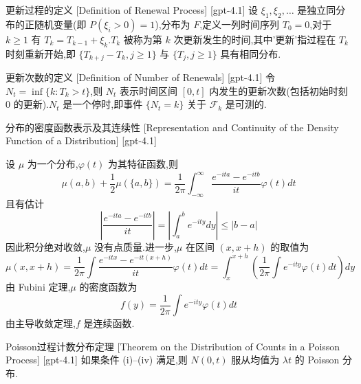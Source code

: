 \documentclass[UTF8]{ctexart}
\begin{document}
    
    
    \begin{dfn}
        {更新过程的定义}
        [Definition of Renewal Process]
        [gpt-4.1]
        设 $\xi_1, \xi_2, \ldots$ 是独立同分布的正随机变量(即 $P(\xi_i > 0) = 1$),分布为 $F$,定义一列时间序列 $T_0 = 0$,对于 $k \geq 1$ 有 $T_k = T_{k-1} + \xi_k$.$T_k$ 被称为第 $k$ 次更新发生的时间,其中'更新'指过程在 $T_k$ 时刻重新开始,即 $\{T_{k+j} - T_k, j \ge 1\}$ 与 $\{T_j, j \ge 1\}$ 具有相同分布.

    \end{dfn}
    
    
    
    \begin{dfn}
        {更新次数的定义}
        [Definition of Number of Renewals]
        [gpt-4.1]
        令 $N_t = \inf\{k : T_k > t\}$,则 $N_t$ 表示时间区间 $[0, t]$ 内发生的更新次数(包括初始时刻 0 的更新).$N_t$ 是一个停时,即事件 $\{N_t = k\}$ 关于 $\mathcal{F}_k$ 是可测的.

    \end{dfn}
    
    
    
    \begin{thm}
        {分布的密度函数表示及其连续性}
        [Representation and Continuity of the Density Function of a Distribution]
        [gpt-4.1]
        
设 $\mu$ 为一个分布,$\varphi(t)$ 为其特征函数,则
\[
\mu(a, b) + \frac{1}{2} \mu(\{a, b\}) = \frac{1}{2\pi} \int_{-\infty}^{\infty} \frac{e^{-ita} - e^{-itb}}{it} \varphi(t) dt
\]
且有估计
\[
\left| \frac{e^{-ita} - e^{-itb}}{it} \right| = \left| \int_{a}^{b} e^{-ity} dy \right| \leq |b-a|
\]
因此积分绝对收敛,$\mu$ 没有点质量.进一步,$\mu$ 在区间 $(x, x+h)$ 的取值为
\[
\mu(x, x+h) = \frac{1}{2\pi} \int \frac{e^{-itx} - e^{-it(x+h)}}{it} \varphi(t) dt = \int_{x}^{x+h} \left( \frac{1}{2\pi} \int e^{-ity} \varphi(t) dt \right) dy
\]
由 Fubini 定理,$\mu$ 的密度函数为
\[
f(y) = \frac{1}{2\pi} \int e^{-ity} \varphi(t) dt
\]
由主导收敛定理,$f$ 是连续函数.

    \end{thm}
    
    
    
    \begin{thm}
        {Poisson过程计数分布定理}
        [Theorem on the Distribution of Counts in a Poisson Process]
        [gpt-4.1]
        如果条件 (i)–(iv) 满足,则 $N(0, t)$ 服从均值为 $\lambda t$ 的 Poisson 分布.
    \end{thm}
    
\end{document}
